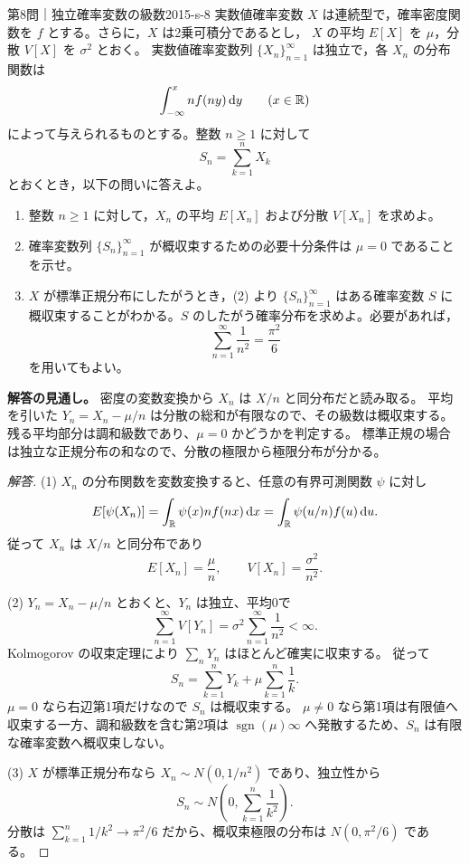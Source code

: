 \begin{problem}{第8問｜独立確率変数の級数}{2015-s-8}
実数値確率変数 $X$ は連続型で，確率密度関数を $f$ とする。さらに，$X$ は2乗可積分であるとし，
$X$ の平均 $E[X]$ を $\mu$，分散 $V[X]$ を $\sigma^2$ とおく。
実数値確率変数列 $\{X_n\}_{n=1}^\infty$ は独立で，各 $X_n$ の分布関数は
\[
\int_{-\infty}^xnf(ny)\,\mathrm{d} y\qquad(x\in\mathbb{R})
\]
によって与えられるものとする。整数 $n\ge1$ に対して
\[
S_n=\sum_{k=1}^nX_k
\]
とおくとき，以下の問いに答えよ。
\begin{enumerate}
  \item[(1)] 整数 $n\ge1$ に対して，$X_n$ の平均 $E[X_n]$ および分散 $V[X_n]$ を求めよ。
  \item[(2)] 確率変数列 $\{S_n\}_{n=1}^\infty$ が概収束するための必要十分条件は $\mu=0$ であることを示せ。
  \item[(3)] $X$ が標準正規分布にしたがうとき，(2) より $\{S_n\}_{n=1}^\infty$ はある確率変数 $S$ に概収束することがわかる。$S$ のしたがう確率分布を求めよ。必要があれば，
  \[
  \sum_{n=1}^\infty\frac1{n^2}=\frac{\pi^2}6
  \]
  を用いてもよい。
\end{enumerate}
\end{problem}
\begin{memo*}
\textbf{解答の見通し。}
密度の変数変換から $X_n$ は $X/n$ と同分布だと読み取る。
平均を引いた $Y_n=X_n-\mu/n$ は分散の総和が有限なので、その級数は概収束する。
残る平均部分は調和級数であり、$\mu=0$ かどうかを判定する。
標準正規の場合は独立な正規分布の和なので、分散の極限から極限分布が分かる。
\end{memo*}
\begin{proof}[解答]
(1) $X_n$ の分布関数を変数変換すると、任意の有界可測関数 $\psi$ に対し
\[
E[\psi(X_n)]=\int_{\mathbb{R}}\psi(x)nf(nx)\,\mathrm{d} x
=\int_{\mathbb{R}}\psi(u/n)f(u)\,\mathrm{d} u.
\]
従って $X_n$ は $X/n$ と同分布であり
\[
E[X_n]=\frac\mu n,\qquad V[X_n]=\frac{\sigma^2}{n^2}.
\]

(2) $Y_n=X_n-\mu/n$ とおくと、$Y_n$ は独立、平均0で
\[
\sum_{n=1}^\infty V[Y_n]
=\sigma^2\sum_{n=1}^\infty\frac1{n^2}<\infty.
\]
Kolmogorov の収束定理により $\sum_nY_n$ はほとんど確実に収束する。
従って
\[
S_n=\sum_{k=1}^nY_k+\mu\sum_{k=1}^n\frac1k.
\]
$\mu=0$ なら右辺第1項だけなので $S_n$ は概収束する。
$\mu\ne0$ なら第1項は有限値へ収束する一方、調和級数を含む第2項は
$\operatorname{sgn}(\mu)\infty$ へ発散するため、$S_n$ は有限な確率変数へ概収束しない。

(3) $X$ が標準正規分布なら $X_n\sim N(0,1/n^2)$ であり、独立性から
\[
S_n\sim N\left(0,\sum_{k=1}^n\frac1{k^2}\right).
\]
分散は $\sum_{k=1}^n1/k^2\to\pi^2/6$ だから、概収束極限の分布は
$N(0,\pi^2/6)$ である。
\end{proof}

